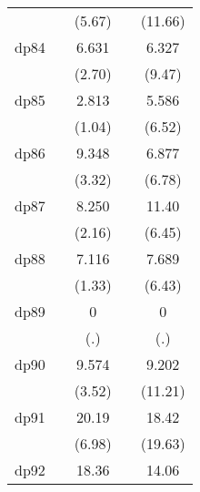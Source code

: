 {\begin{tabular}{l*{4}{c}}
            &                     &      (5.67)         &                     &     (11.66)         \\
[1em]
dp84        &                     &       6.631\sym{**} &                     &       6.327\sym{***}\\
            &                     &      (2.70)         &                     &      (9.47)         \\
[1em]
dp85        &                     &       2.813         &                     &       5.586\sym{***}\\
            &                     &      (1.04)         &                     &      (6.52)         \\
[1em]
dp86        &                     &       9.348\sym{***}&                     &       6.877\sym{***}\\
            &                     &      (3.32)         &                     &      (6.78)         \\
[1em]
dp87        &                     &       8.250\sym{*}  &                     &       11.40\sym{***}\\
            &                     &      (2.16)         &                     &      (6.45)         \\
[1em]
dp88        &                     &       7.116         &                     &       7.689\sym{***}\\
            &                     &      (1.33)         &                     &      (6.43)         \\
[1em]
dp89        &                     &           0         &                     &           0         \\
            &                     &         (.)         &                     &         (.)         \\
[1em]
dp90        &                     &       9.574\sym{***}&                     &       9.202\sym{***}\\
            &                     &      (3.52)         &                     &     (11.21)         \\
[1em]
dp91        &                     &       20.19\sym{***}&                     &       18.42\sym{***}\\
            &                     &      (6.98)         &                     &     (19.63)         \\
[1em]
dp92        &                     &       18.36\sym{***}&                     &       14.06\sym{***}\\

\end{tabular}}
